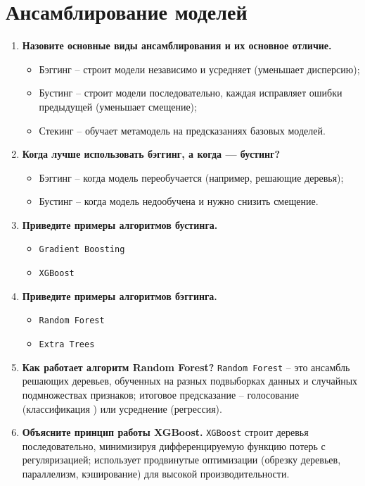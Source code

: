 \documentclass{article}
\begin{document}
\section{Ансамблирование моделей}
\begin{enumerate}
    \item \textbf{Назовите основные виды ансамблирования и их основное отличие.}
    \begin{itemize}
        \item Бэггинг -- строит модели независимо и усредняет (уменьшает дисперсию);
        \item Бустинг -- строит модели последовательно, каждая исправляет ошибки предыдущей (уменьшает смещение);
        \item Стекинг -- обучает метамодель на предсказаниях базовых моделей.
    \end{itemize}
    \item \textbf{Когда лучше использовать бэггинг, а когда — бустинг?}
    \begin{itemize}
        \item Бэггинг -- когда модель переобучается (например, решающие деревья);
        \item Бустинг -- когда модель недообучена и нужно снизить смещение.
    \end{itemize}
    \item \textbf{Приведите примеры алгоритмов бустинга.}
    \begin{itemize}
        \item \texttt{Gradient Boosting}
        \item \texttt{XGBoost}
    \end{itemize}
    \item \textbf{Приведите примеры алгоритмов бэггинга.}
    \begin{itemize}
        \item \texttt{Random Forest}
        \item \texttt{Extra Trees}
    \end{itemize}
    \item \textbf{Как работает алгоритм Random Forest?} \texttt{Random Forest} -- это ансамбль решающих деревьев, обученных на разных подвыборках данных и случайных подмножествах признаков; итоговое предсказание -- голосование (классификация ) или усреднение (регрессия).
    \item \textbf{Объясните принцип работы XGBoost.} \texttt{XGBoost} строит деревья последовательно, минимизируя дифференцируемую функцию потерь с регуляризацией; использует продвинутые оптимизации (обрезку деревьев, параллелизм, кэширование) для высокой производительности.

\end{enumerate}
\end{document}
